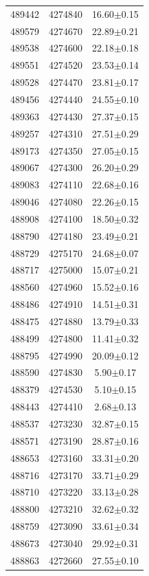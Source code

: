 \documentclass[12pt,letter]{article}
\begin{document}
\begin{center}
\begin{supertabular}{c c c}
489442	 & 	4274840	 & 	16.60$\pm$0.15\\ 
489579	 & 	4274670	 & 	22.89$\pm$0.21\\ 
489538	 & 	4274600	 & 	22.18$\pm$0.18\\ 
489551	 & 	4274520	 & 	23.53$\pm$0.14\\ 
489528	 & 	4274470	 & 	23.81$\pm$0.17\\ 
489456	 & 	4274440	 & 	24.55$\pm$0.10\\ 
489363	 & 	4274430	 & 	27.37$\pm$0.15\\ 
489257	 & 	4274310	 & 	27.51$\pm$0.29\\ 
489173	 & 	4274350	 & 	27.05$\pm$0.15\\ 
489067	 & 	4274300	 & 	26.20$\pm$0.29\\ 
489083	 & 	4274110	 & 	22.68$\pm$0.16\\ 
489046	 & 	4274080	 & 	22.26$\pm$0.15\\ 
488908	 & 	4274100	 & 	18.50$\pm$0.32\\ 
488790	 & 	4274180	 & 	23.49$\pm$0.21\\ 
488729	 & 	4275170	 & 	24.68$\pm$0.07\\ 
488717	 & 	4275000	 & 	15.07$\pm$0.21\\ 
488560	 & 	4274960	 & 	15.52$\pm$0.16\\ 
488486	 & 	4274910	 & 	14.51$\pm$0.31\\ 
488475	 & 	4274880	 & 	13.79$\pm$0.33\\ 
488499	 & 	4274800	 & 	11.41$\pm$0.32\\ 
488795	 & 	4274990	 & 	20.09$\pm$0.12\\ 
488590	 & 	4274830	 & 	5.90$\pm$0.17\\ 
488379	 & 	4274530	 & 	5.10$\pm$0.15\\ 
488443	 & 	4274410	 & 	2.68$\pm$0.13\\ 
488537	 & 	4273230	 & 	32.87$\pm$0.15\\ 
488571	 & 	4273190	 & 	28.87$\pm$0.16\\ 
488653	 & 	4273160	 & 	33.31$\pm$0.20\\ 
488716	 & 	4273170	 & 	33.71$\pm$0.29\\ 
488710	 & 	4273220	 & 	33.13$\pm$0.28\\ 
488800	 & 	4273210	 & 	32.62$\pm$0.32\\ 
488759	 & 	4273090	 & 	33.61$\pm$0.34\\ 
488673	 & 	4273040	 & 	29.92$\pm$0.31\\ 
488863	 & 	4272660	 & 	27.55$\pm$0.10\\ 

\end{supertabular}
\end{center}
\end{document}
